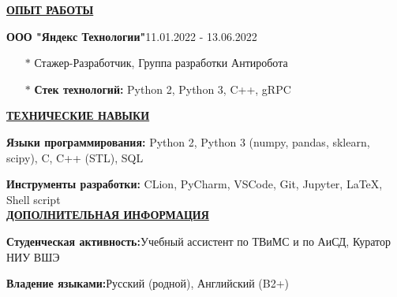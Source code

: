 \documentclass[11pt]{article}
\begin{document}
\noindent \textbf{\underline{ОПЫТ РАБОТЫ}} \\
\par \textbf{ООО "Яндекс Технологии"}\hfill 11.01.2022 - 13.06.2022
\begin{itemize}
    \item[$\ast$] Стажер-Разработчик, Группа разработки Антиробота
    \item[$\ast$] \textbf{Стек технологий:} Python 2, Python 3, C++, gRPC 
\end{itemize}

\noindent \textbf{\underline{ТЕХНИЧЕСКИЕ НАВЫКИ}}\\
 \par \textbf{Языки программирования:} \hfill Python 2, Python 3 (numpy, pandas, sklearn, scipy), C, C++ (STL), SQL\\
\par \textbf{Инструменты разработки:} \hfill CLion, PyCharm, VSCode, Git, Jupyter, \LaTeX{}, Shell script
\\

\noindent \textbf{\underline{ДОПОЛНИТЕЛЬНАЯ ИНФОРМАЦИЯ}} \\
\par \textbf{Студенческая активность:}\hfill Учебный ассистент по ТВиМС и по АиСД, Куратор НИУ ВШЭ \\
\par \textbf{Владение языками:}\hfill Русский (родной), Английский (B2+)
\end{document}
